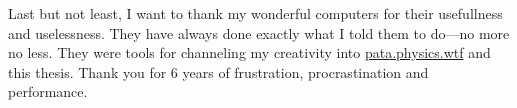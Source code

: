 \spirals

Last but not least, I want to thank my wonderful computers for their usefullness and uselessness. They have always done exactly what I told them to do---no more no less. They were tools for channeling my creativity into \url{pata.physics.wtf} and this thesis. Thank you for 6 years of frustration, procrastination and performance.










\cleardoublepage
